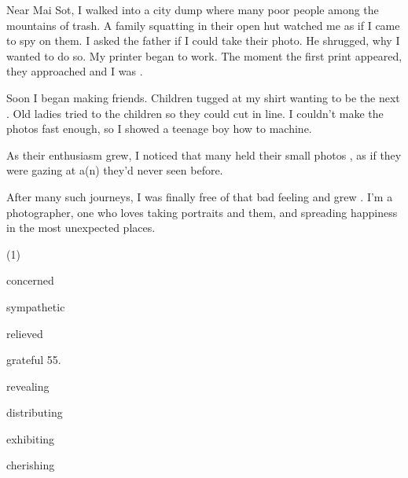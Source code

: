 \documentclass{英语试卷}
\begin{document}
\par Near Mai Sot, I walked into a city dump where many poor people  among the mountains of trash. A family squatting in their open hut watched me  as if I came to spy on them. I asked the father if I could take their photo. He shrugged,  why I wanted to do so. My printer began to work. The moment the first print appeared, they approached and I was .\par
\par Soon I began making friends. Children tugged at my shirt wanting to be the next . Old ladies tried to  the children so they could cut in line. I couldn't make the photos fast enough, so I showed a teenage boy how to  machine.\par
\par As their enthusiasm grew, I noticed that many held their small photos , as if they were gazing at a(n)  they'd never seen before.\par
\par After many such journeys, I was finally free of that bad feeling and grew . I'm a photographer, one who loves taking portraits and  them, and spreading happiness in the most unexpected places.\par
{}
\begin{choices}(1)
  \item concerned
  \item sympathetic
  \item relieved
  \item grateful 55.
  \item revealing
  \item distributing
  \item exhibiting
  \item cherishing
\end{choices}
\end{document}
